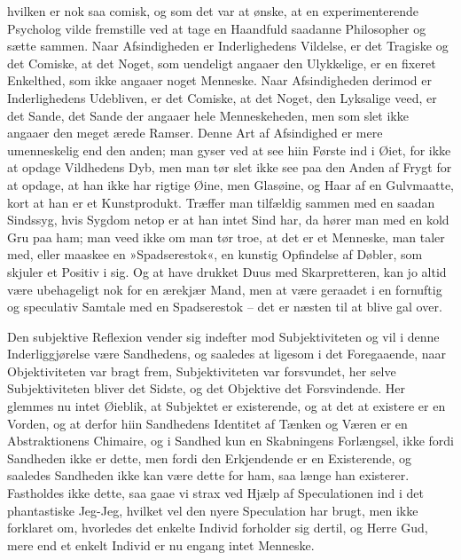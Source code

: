 \documentclass[12pt,a4paper]{article}
\begin{document}
hvilken er nok saa comisk, og som det var at ønske, at en experimenterende Psycholog vilde fremstille ved at tage en Haandfuld saadanne Philosopher og sætte sammen. Naar Afsindigheden er Inderlighedens Vildelse, er det Tragiske og det Comiske, at det Noget, som uendeligt angaaer den Ulykkelige, er en fixeret Enkelthed, som ikke angaaer noget Menneske. Naar Afsindigheden derimod er Inderlighedens Udebliven, er det Comiske, at det Noget, den Lyksalige veed, er det Sande, det Sande der angaaer hele Menneskeheden, men som slet ikke angaaer den meget ærede Ramser. Denne Art af Afsindighed er mere umenneskelig end den anden; man gyser ved at see hiin Første ind i Øiet, for ikke at opdage Vildhedens Dyb, men man tør slet ikke see paa den Anden af Frygt for at opdage, at han ikke har rigtige Øine, men Glasøine, og Haar af en Gulvmaatte, kort at han er et Kunstprodukt. Træffer man tilfældig sammen med en saadan Sindssyg, hvis Sygdom netop er at han intet Sind har, da hører man med en kold Gru paa ham; man veed ikke om man tør troe, at det er et Menneske, man taler med, eller maaskee en »Spadserestok«, en kunstig Opfindelse af Døbler, som skjuler et Positiv i sig. Og at have drukket Duus med Skarpretteren, kan jo altid være ubehageligt nok for en ærekjær Mand, men at være geraadet i en fornuftig og speculativ Samtale med en Spadserestok – det er næsten til at blive gal over.

Den subjektive Reflexion vender sig indefter mod Subjektiviteten og vil i denne Inderliggjørelse være Sandhedens, og saaledes at ligesom i det Foregaaende, naar Objektiviteten var bragt frem, Subjektiviteten var forsvundet, her selve Subjektiviteten bliver det Sidste, og det Objektive det Forsvindende. Her glemmes nu intet Øieblik, at Subjektet er existerende, og at det at existere er en Vorden, og at derfor hiin Sandhedens Identitet af Tænken og Væren er en Abstraktionens Chimaire, og i Sandhed kun en Skabningens Forlængsel, ikke fordi Sandheden ikke er dette, men fordi den Erkjendende er en Existerende, og saaledes Sandheden ikke kan være dette for ham, saa længe han existerer. Fastholdes ikke dette, saa gaae vi strax ved Hjælp af Speculationen ind i det phantastiske Jeg-Jeg, hvilket vel den nyere Speculation har brugt, men ikke forklaret om, hvorledes det enkelte Individ forholder sig dertil, og Herre Gud, mere end et enkelt Individ er nu engang intet Menneske.
\end{document}
